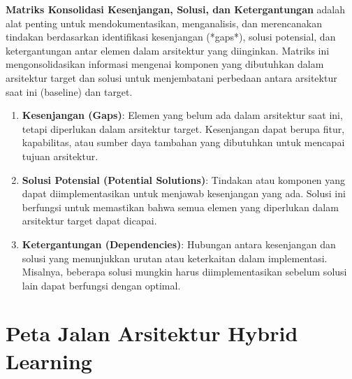 \textbf{Matriks Konsolidasi Kesenjangan, Solusi, dan Ketergantungan} adalah alat penting untuk mendokumentasikan, menganalisis, dan merencanakan tindakan berdasarkan identifikasi kesenjangan (*gaps*), solusi potensial, dan ketergantungan antar elemen dalam arsitektur yang diinginkan. Matriks ini mengonsolidasikan informasi mengenai komponen yang dibutuhkan dalam arsitektur target dan solusi untuk menjembatani perbedaan antara arsitektur saat ini (baseline) dan target.

\begin{enumerate}
	\item \textbf{Kesenjangan (Gaps)}: Elemen yang belum ada dalam arsitektur saat ini, tetapi diperlukan dalam arsitektur target. Kesenjangan dapat berupa fitur, kapabilitas, atau sumber daya tambahan yang dibutuhkan untuk mencapai tujuan arsitektur.
	
	\item \textbf{Solusi Potensial (Potential Solutions)}: Tindakan atau komponen yang dapat diimplementasikan untuk menjawab kesenjangan yang ada. Solusi ini berfungsi untuk memastikan bahwa semua elemen yang diperlukan dalam arsitektur target dapat dicapai.
	
	\item \textbf{Ketergantungan (Dependencies)}: Hubungan antara kesenjangan dan solusi yang menunjukkan urutan atau keterkaitan dalam implementasi. Misalnya, beberapa solusi mungkin harus diimplementasikan sebelum solusi lain dapat berfungsi dengan optimal.
\end{enumerate}

\section{Peta Jalan Arsitektur Hybrid Learning}
\label{sec:peta_jalan}

